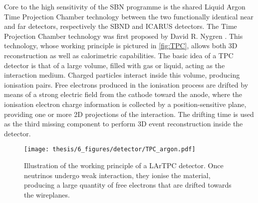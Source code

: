 Core to the high sensitivity of the SBN programme is the shared Liquid Argon Time Projection Chamber technology between the two functionally identical near and far detectors, respectively the SBND and ICARUS detectors. The Time Projection Chamber technology was first proposed by David R. Nygren \cite{Marx:1978zz}. This technology, whose working principle is pictured in \autoref{fig:TPC}, allows both 3D reconstruction as well as calorimetric capabilities. The basic idea of a TPC detector is that of a large volume, filled with gas or liquid, acting as the interaction medium. Charged particles interact inside this volume, producing ionisation pairs. Free electrons produced in the ionisation process are drifted by means of a strong electric field from the cathode toward the anode, where the ionisation electron charge information is collected by a position-sensitive plane, providing one or more 2D projections of the interaction. The drifting time is used as the third missing component to perform 3D event reconstruction inside the detector. 

\begin{figure}
    \centering
    \texttt{[image: thesis/6\_figures/detector/TPC\_argon.pdf]}
    \caption[LArTPC illustration]{Illustration of the working principle of a LArTPC detector. Once neutrinos undergo weak interaction, they ionise the material, producing a large quantity of free electrons that are drifted towards the wireplanes. }
    \label{fig:TPC}
\end{figure}


